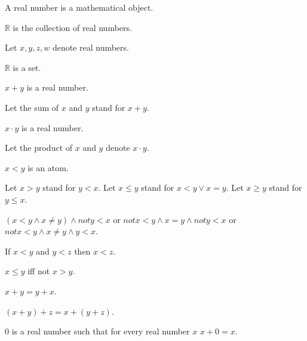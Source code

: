 \documentclass{article}
\begin{document}
\begin{forthel}

\begin{signature}
A real number is a mathematical object.
\end{signature}

\begin{definition}
$\mathbb{R}$ is the collection of real numbers.
\end{definition}
Let $x,y,z,w$ denote real numbers.

\begin{axiom}
$\mathbb{R}$ is a set.
\end{axiom}


\begin{signature}[1 12 A1]
$x + y$ is a real number.
\end{signature}
Let the sum of $x$ and $y$ stand for $x + y$.

\begin{signature}[1 12 M1]
$x \cdot y$ is a real number.
\end{signature}
Let the product of $x$ and $y$ denote $x \cdot y$.

\begin{signature}[1 5]
$x < y$ is an atom.
\end{signature}
Let $x > y$ stand for $y < x$.
Let $x \leq y$ stand for $x < y \vee x = y$.
Let $x \geq y$ stand for $y \leq x$.

\begin{axiom}[1 5 i]
$(x < y \wedge x \neq y) \wedge not y < x$
or $not x < y \wedge x = y \wedge not y < x$
or $not x < y \wedge x \neq y \wedge y < x$.
\end{axiom}

\begin{axiom}[1 5 ii]
If $x < y$ and $y < z$ then $x < z$.
\end{axiom}

\begin{proposition}
$x \leq y$ iff not $x > y$.
\end{proposition}

\begin{axiom}[1 12 A2]
$x + y = y + x$.
\end{axiom}

\begin{axiom}[1 12 A3]
$(x + y) + z = x + (y + z)$.
\end{axiom}

\begin{signature}[1 12 A4]
$0$ is a real number such that
for every real number $x$ $x + 0 = x$.
\end{signature}


\end{forthel}
\end{document}
